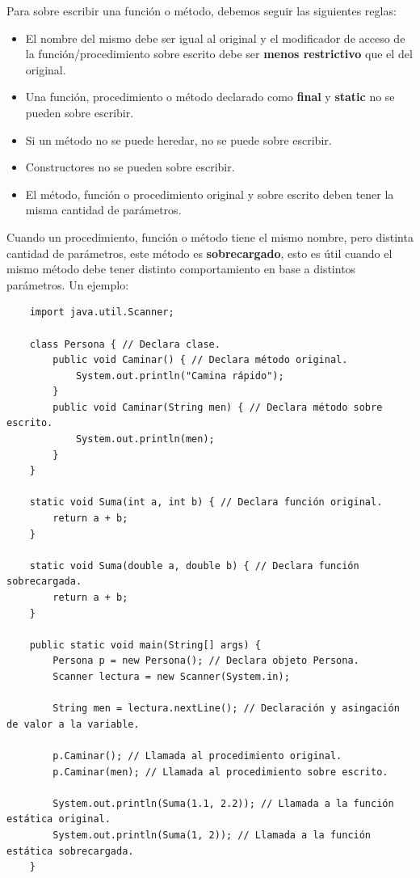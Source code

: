 Para sobre escribir una función o método, debemos seguir las siguientes reglas:
\begin{itemize}
    \item El nombre del mismo debe ser igual al original y el modificador de acceso de la función/procedimiento sobre escrito debe ser \textbf{menos restrictivo} que el del original.
    \item Una función, procedimiento o método declarado como \textbf{final} y \textbf{static} no se pueden sobre escribir.
    \item Si un método no se puede heredar, no se puede sobre escribir.
    \item Constructores no se pueden sobre escribir.
    \item El método, función o procedimiento original y sobre escrito deben tener la misma cantidad de parámetros.
\end{itemize}

Cuando un procedimiento, función o método tiene el mismo nombre, pero distinta cantidad de parámetros, este método es \textbf{sobrecargado}, esto es útil cuando el mismo método debe tener distinto comportamiento en base a distintos parámetros. Un ejemplo:
\begin{lstlisting}
    import java.util.Scanner;
    
    class Persona { // Declara clase.
        public void Caminar() { // Declara método original.
            System.out.println("Camina rápido");
        }
        public void Caminar(String men) { // Declara método sobre escrito.
            System.out.println(men);
        }
    }
    
    static void Suma(int a, int b) { // Declara función original.
        return a + b;
    }
    
    static void Suma(double a, double b) { // Declara función sobrecargada.
        return a + b;
    }
    
    public static void main(String[] args) {
        Persona p = new Persona(); // Declara objeto Persona.
        Scanner lectura = new Scanner(System.in);
        
        String men = lectura.nextLine(); // Declaración y asingación de valor a la variable.
        
        p.Caminar(); // Llamada al procedimiento original.
        p.Caminar(men); // Llamada al procedimiento sobre escrito.
        
        System.out.println(Suma(1.1, 2.2)); // Llamada a la función estática original.
        System.out.println(Suma(1, 2)); // Llamada a la función estática sobrecargada.
    }
\end{lstlisting}


